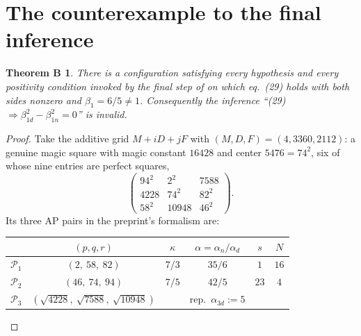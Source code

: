 \documentclass[11pt]{amsart}
\newtheorem*{thmB}{Theorem B}
\theoremstyle{remark}
\newcommand{\cP}{\mathcal{P}}
\begin{document}
\section{The counterexample to the final inference}\label{sec:thmB}

\begin{thmB}
There is a configuration satisfying every hypothesis and every
positivity condition invoked by the final step of \cite{Hill} on which
eq.~(29) holds with both sides nonzero and $\beta_1 = 6/5 \neq 1$.
Consequently the inference ``(29) $\Rightarrow \beta_{1d}^2 -
\beta_{1n}^2 = 0$'' is invalid.
\end{thmB}

\begin{proof}
Take the additive grid $M + iD + jF$ with $(M, D, F) = (4, 3360,
2112)$: a genuine magic square with magic constant $16428$ and center
$5476 = 74^2$, six of whose nine entries are perfect squares,
\begin{equation*}
\begin{pmatrix} 94^2 & 2^2 & 7588 \\ 4228 & 74^2 & 82^2 \\
58^2 & 10948 & 46^2 \end{pmatrix}.
\end{equation*}
Its three AP pairs in the preprint's formalism are:
\begin{center}
\begin{tabular}{lccccc}
\toprule
 & $(p, q, r)$ & $\kappa$ & $\alpha = \alpha_n/\alpha_d$ & $s$ & $N$ \\
\midrule
$\cP_1$ & $(2,\ 58,\ 82)$ & $7/3$ & $35/6$ & $1$ & $16$ \\
$\cP_2$ & $(46,\ 74,\ 94)$ & $7/5$ & $42/5$ & $23$ & $4$ \\
$\cP_3$ & $(\sqrt{4228},\ \sqrt{7588},\ \sqrt{10948})$
  & & rep.\ $\alpha_{3d} := 5$ & &\\
\bottomrule
\end{tabular}
\end{center}
\smallskip


\end{proof}
\end{document}
